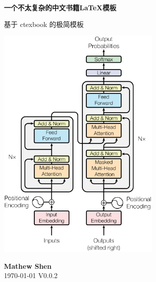 \documentclass{ctexbook}
\begin{document}
\frontmatter
\begin{titlepage}
    \begin{center}
        \vspace*{1cm}
 
        \textbf{一个不太复杂的中文书籍\LaTeX 模板}
 
        \vspace{0.5cm}
         基于 ctexbook 的极简模板
             
        \vspace{0.5cm}

        \includegraphics[width=0.6\textwidth]{./figures/transformer.pdf}

        \vfill

        \vspace{0.5cm}
        \textbf{Mathew Shen} \\
        \today \hspace{1cm} V0.0.2

    \end{center}
 \end{titlepage}


\tableofcontents
\setcounter{tocdepth}{2}




\mainmatter






\backmatter




\printbibliography[title={参考文献}, heading=bibintoc]

\printindex

\end{document}
